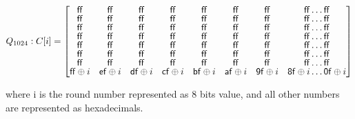 \begin{itemize}
    $Q_{1024}: C[i] = \renewcommand\arraystretch{0.75}
    \begin{bmatrix}
      \mathsf{ff} & \mathsf{ff} & \mathsf{ff} & \mathsf{ff} & \mathsf{ff} & \mathsf{ff} & \mathsf{ff} & \mathsf{ff} \dots \mathsf{ff} \\
      \mathsf{ff} & \mathsf{ff} & \mathsf{ff} & \mathsf{ff} & \mathsf{ff} & \mathsf{ff} & \mathsf{ff} & \mathsf{ff} \dots \mathsf{ff} \\
      \mathsf{ff} & \mathsf{ff} & \mathsf{ff} & \mathsf{ff} & \mathsf{ff} & \mathsf{ff} & \mathsf{ff} & \mathsf{ff} \dots \mathsf{ff} \\
      \mathsf{ff} & \mathsf{ff} & \mathsf{ff} & \mathsf{ff} & \mathsf{ff} & \mathsf{ff} & \mathsf{ff} & \mathsf{ff} \dots \mathsf{ff} \\
      \mathsf{ff} & \mathsf{ff} & \mathsf{ff} & \mathsf{ff} & \mathsf{ff} & \mathsf{ff} & \mathsf{ff} & \mathsf{ff} \dots \mathsf{ff} \\
      \mathsf{ff} & \mathsf{ff} & \mathsf{ff} & \mathsf{ff} & \mathsf{ff} & \mathsf{ff} & \mathsf{ff} & \mathsf{ff} \dots \mathsf{ff} \\
      \mathsf{ff} & \mathsf{ff} & \mathsf{ff} & \mathsf{ff} & \mathsf{ff} & \mathsf{ff} & \mathsf{ff} & \mathsf{ff} \dots \mathsf{ff} \\
      \mathsf{ff} \oplus i & \mathsf{ef} \oplus i & \mathsf{df} \oplus i & \mathsf{cf} \oplus i & \mathsf{bf} \oplus i & \mathsf{af} \oplus i & \mathsf{9f} \oplus i & \mathsf{8f} \oplus i \dots \mathsf{0f} \oplus i
    \end{bmatrix}$

    where i is the round number represented as 8 bits value, and all other numbers are represented as
    hexadecimals.
    

\end{itemize}
